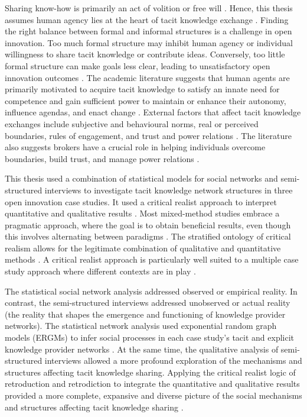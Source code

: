 Sharing know-how is primarily an act of volition or free will \citep{polanyi1966tacit,hubrich2015embodiment,zhang2016critical}. Hence, this thesis assumes human agency lies at the heart of tacit knowledge exchange \citep{phelps2012knowledge}. Finding the right balance between formal and informal structures is a challenge in open innovation. Too much formal structure may inhibit human agency or individual willingness to share tacit knowledge or contribute ideas. Conversely, too little formal structure can make goals less clear, leading to unsatisfactory open innovation outcomes \citep{davis2010agency,nunes2020managing}. The academic literature suggests that human agents are primarily motivated to acquire tacit knowledge to satisfy an innate need for competence and gain sufficient power to maintain or enhance their autonomy, influence agendas, and enact change \citep{white1959motivation,bandura1977self,deci1989self}. External factors that affect tacit knowledge exchanges include subjective and behavioural norms, real or perceived boundaries, rules of engagement, and trust and power relations \citep{parsons1937structure,loyal2001agency}. The literature also suggests brokers have a crucial role in helping individuals overcome boundaries, build trust, and manage power relations \citep{obstfeld2014brokerage,quintane2016brokers}. \medskip

This thesis used a combination of statistical models for social networks and semi-structured interviews to investigate tacit knowledge network structures in three open innovation case studies. It used a critical realist approach to interpret quantitative and qualitative results \citep{bhaskar2013realist}. Most mixed-method studies embrace a pragmatic approach, where the goal is to obtain beneficial results, even though this involves alternating between paradigms \citep{creswell2011designing}. The stratified ontology of critical realism allows for the legitimate combination of qualitative and quantitative methods \citep{giddings2006mixed,mcevoy2006critical,mcavoy2018critical}. A critical realist approach is particularly well suited to a multiple case study approach where different contexts are in play \citep{welch2011theorising}. \medskip

The statistical social network analysis addressed observed or empirical reality. In contrast, the semi-structured interviews addressed unobserved or actual reality (the reality that shapes the emergence and functioning of knowledge provider networks). The statistical network analysis used exponential random graph models (ERGMs) to infer social processes in each case study's tacit and explicit knowledge provider networks \citep{robins2007introduction,lusher2013exponential}. At the same time, the qualitative analysis of semi-structured interviews allowed a more profound exploration of the mechanisms and structures affecting tacit knowledge sharing. Applying the critical realist logic of retroduction and retrodiction to integrate the quantitative and qualitative results provided a more complete, expansive and diverse picture of the social mechanisms and structures affecting tacit knowledge sharing \citep{zachariadis2013methodological,mcavoy2018critical}. \medskip

